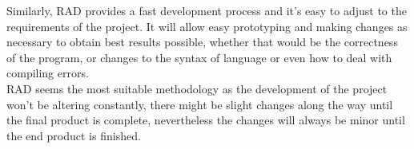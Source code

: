 \documentclass[a4paper]{article}
\begin{document}
Similarly, RAD provides a fast development process and it's easy to adjust to the requirements of the project. It will allow easy prototyping and making changes as necessary to obtain best results possible, whether that would be the correctness of the program, or changes to the syntax of language or even how to deal with compiling errors.\\

RAD seems the most suitable methodology as the development of the project won't be altering constantly, there might be slight changes along the way until the final product is complete, nevertheless the changes will always be minor until the end product is finished.

\newpage
\printbibliography
\end{document}
